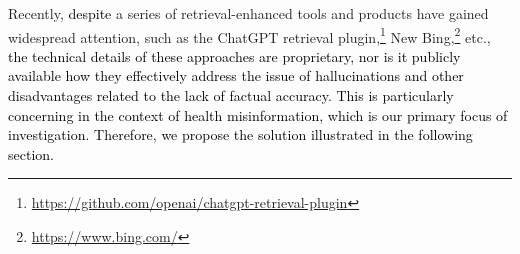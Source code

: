 Recently, \textcolor{black}{despite} a series of retrieval-enhanced tools and products have gained widespread attention, such as the ChatGPT retrieval plugin,\footnote{\url{https://github.com/openai/chatgpt-retrieval-plugin}} %
New Bing,\footnote{\url{https://www.bing.com/}} etc., \textcolor{black}{the technical details of these approaches are proprietary, nor is it publicly available how they effectively address the issue of hallucinations and other disadvantages related to the lack of factual accuracy. This is particularly concerning in the context of health misinformation, which is our primary focus of investigation. Therefore, we propose the solution illustrated in the following section.}